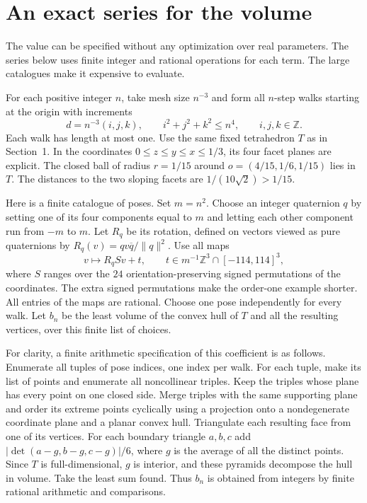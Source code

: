 \section{An exact series for the volume}

The value can be specified without any optimization over real parameters. The series below uses finite integer and rational operations for each term. The large catalogues make it expensive to evaluate.

For each positive integer $n$, take mesh size $n^{-3}$ and form all
$n$-step walks starting at the origin with increments
\[
    d=n^{-3}(i,j,k),\qquad i^2+j^2+k^2\le n^4,\qquad i,j,k\in\mathbb Z.
\]
Each walk has length at most one. Use the same fixed tetrahedron $T$ as in Section~1. In the
coordinates $0\le z\le y\le x\le1/3$, its four facet planes are explicit.
The closed ball of radius $r=1/15$ around
$o=(4/15,1/6,1/15)$ lies in $T$. The distances to the two sloping facets are
$1/(10\sqrt2)>1/15$.

Here is a finite catalogue of poses. Set $m=n^2$. Choose an integer
quaternion $q$ by setting one of its four components equal to $m$ and
letting each other component run from $-m$ to $m$. Let $R_q$ be its
rotation, defined on vectors viewed as pure quaternions by
$R_q(v)=qv\overline q/\|q\|^2$. Use all maps
\[
     v\longmapsto R_qSv+t,\qquad
     t\in m^{-1}\mathbb Z^3\cap[-114,114]^3,
\]
where $S$ ranges over the $24$ orientation-preserving signed permutations
of the coordinates. The extra signed permutations make the order-one
example shorter. All entries of the maps are rational. Choose one pose
independently for every walk. Let $b_n$ be the least volume of the convex
hull of $T$ and all the resulting vertices, over this finite list of
choices.

For clarity, a finite arithmetic specification of this coefficient is
as follows. Enumerate all tuples of pose indices, one index per walk.
For each tuple, make its list of points and enumerate all noncollinear
triples. Keep the triples whose plane has every point on one closed side.
Merge triples with the same supporting plane and order its extreme points
cyclically using a projection onto a nondegenerate coordinate plane and
a planar convex hull. Triangulate each resulting face from one of its
vertices. For each boundary triangle $a,b,c$ add
$|\det(a-g,b-g,c-g)|/6$, where $g$ is the average of all the distinct
points. Since $T$ is full-dimensional, $g$ is interior, and these pyramids
decompose the hull in volume. Take the least sum found. Thus $b_n$ is
obtained from integers by finite rational arithmetic and comparisons.

